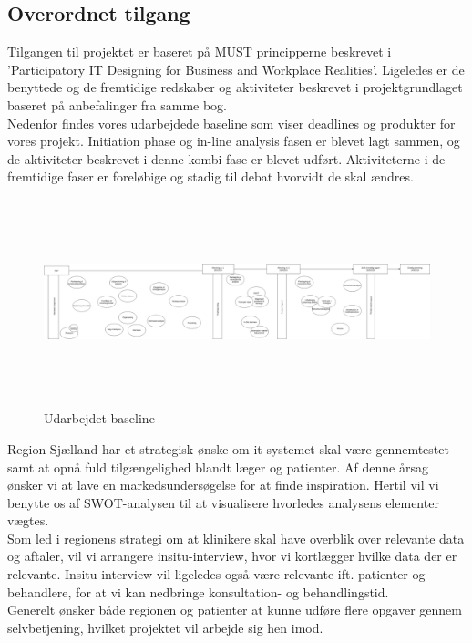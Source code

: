 \subsection{Overordnet tilgang}
Tilgangen til projektet er baseret på MUST principperne beskrevet i 'Participatory IT Designing for Business and Workplace Realities'. Ligeledes er de benyttede og de fremtidige redskaber og aktiviteter beskrevet i projektgrundlaget baseret på anbefalinger fra samme bog.\\
Nedenfor findes vores udarbejdede baseline som viser deadlines og produkter for vores projekt. Initiation phase og in-line analysis fasen er blevet lagt sammen, og de aktiviteter beskrevet i denne kombi-fase er blevet udført. Aktiviteterne i de fremtidige faser er foreløbige og stadig til debat hvorvidt de skal ændres. 
\begin{figure}[H]
	\hspace{-1.5cm}
	\includegraphics[width=1.2\textwidth, height=6cm]{Materials/Baseline}
	\caption{Udarbejdet baseline}
\end{figure}
Region Sjælland har et strategisk ønske om it systemet skal være gennemtestet samt at opnå fuld tilgængelighed blandt læger og patienter. Af denne årsag ønsker vi at lave en markedsundersøgelse for at finde inspiration. Hertil vil vi benytte os af SWOT-analysen til at visualisere hvorledes analysens elementer vægtes.\\
Som led i regionens strategi om at klinikere skal have overblik over relevante data og aftaler, vil vi arrangere insitu-interview, hvor vi kortlægger hvilke data der er relevante. Insitu-interview vil ligeledes også være relevante ift. patienter og behandlere, for at vi kan nedbringe konsultation- og behandlingstid.\\
Generelt ønsker både regionen og patienter at kunne udføre flere opgaver gennem selvbetjening, hvilket projektet vil arbejde sig hen imod.  